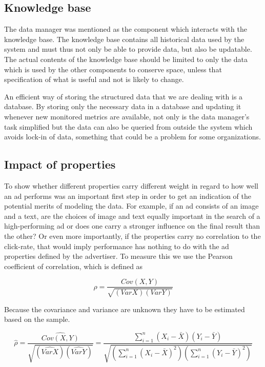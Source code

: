 \documentclass{sig-alternate}
\begin{document}
\subsection{Knowledge base}
The data manager was mentioned as the component which interacts with the knowledge base. The knowledge base contains all historical data used by the system and must thus not only be able to provide data, but also be updatable. The actual contents of the knowledge base should be limited to only the data which is used by the other components to conserve space, unless that specification of what is useful and not is likely to change.

An efficient way of storing the structured data that we are dealing with is a database. By storing only the necessary data in a database and updating it whenever new monitored metrics are available, not only is the data manager's task simplified but the data can also be queried from outside the system which avoids lock-in of data, something that could be a problem for some organizations.

\subsection{Impact of properties}
To show whether different properties carry different weight in regard to how well an ad performs was an important first step in order to get an indication of the potential merits of modeling the data. For example, if an ad consists of an image and a text, are the choices of image and text equally important in the search of a high-performing ad or does one carry a stronger influence on the final result than the other? Or even more importantly, if the properties carry no correlation to the click-rate, that would imply performance has nothing to do with the ad properties defined by the advertiser. To measure this we use the Pearson coefficient of correlation, which is defined as

\begin{equation}
	\rho = \frac{Cov(X, Y)}{\sqrt{(Var X)(Var Y)}}
\end{equation}

Because the covariance and variance are unknown they have to be estimated based on the sample.

\begin{equation}
	\hat{\rho} = \frac{\widehat{Cov(X, Y)}}{\sqrt{(\widehat{Var X})(\widehat{Var Y})}} = \frac{ \sum_{i=1}^{n} (X_i - \bar{X})(Y_i - \bar{Y}) }{ \sqrt{ (\sum_{i=1}^{n} (X_i - \bar{X})^2) (\sum_{i=1}^{n} (Y_i - \bar{Y})^2) } }
\end{equation}
\end{document}
